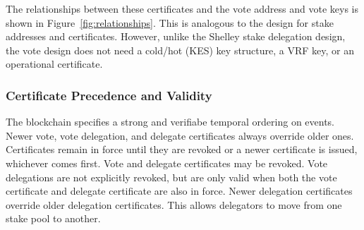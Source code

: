 The relationships between these certificates and the vote address and vote keys is shown in Figure~\ref{fig:relationships}.
This is analogous to the design for stake addresses and certificates.
However, unlike the Shelley stake delegation design, the vote design does not need a cold/hot (KES) key structure, a VRF key, or an operational certificate.

\subsubsection*{Certificate Precedence and Validity}

The blockchain specifies a strong and verifiabe temporal ordering on events.
Newer vote, vote delegation, and delegate certificates always override older ones.  Certificates remain in force until they are revoked or a newer certificate is issued,
whichever comes first.  Vote and delegate certificates may be revoked.  Vote delegations are not explicitly revoked, but are only valid when both the vote certificate
and delegate certificate are also in force.
Newer delegation certificates override older delegation certificates. This allows delegators to move from one stake pool to another.
